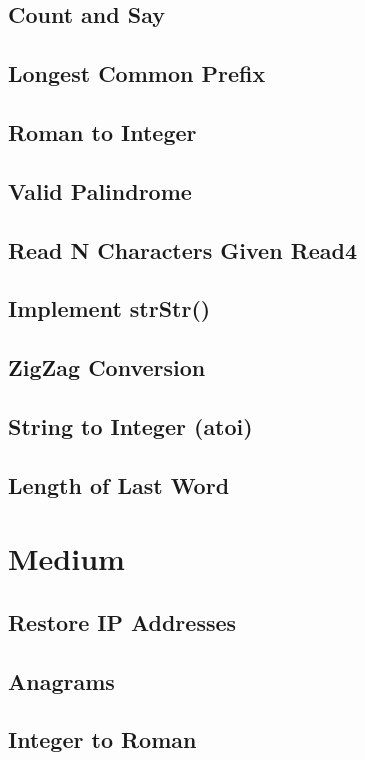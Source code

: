 \documentclass[12pt]{book}
\begin{document}
\subsection{Count and Say}
\label{sec-2-1-4}
\subsection{Longest Common Prefix}
\label{sec-2-1-5}
\subsection{Roman to Integer}
\label{sec-2-1-6}
\subsection{Valid Palindrome}
\label{sec-2-1-7}
\subsection{Read N Characters Given Read4}
\label{sec-2-1-8}
\subsection{Implement strStr()}
\label{sec-2-1-9}
\subsection{ZigZag Conversion}
\label{sec-2-1-10}
\subsection{String to Integer (atoi)}
\label{sec-2-1-11}
\subsection{Length of Last Word}
\label{sec-2-1-12}
\section{Medium}
\label{sec-2-2}
\subsection{Restore IP Addresses}
\label{sec-2-2-1}
\subsection{Anagrams}
\label{sec-2-2-2}
\subsection{Integer to Roman}
\label{sec-2-2-3}
\end{document}
